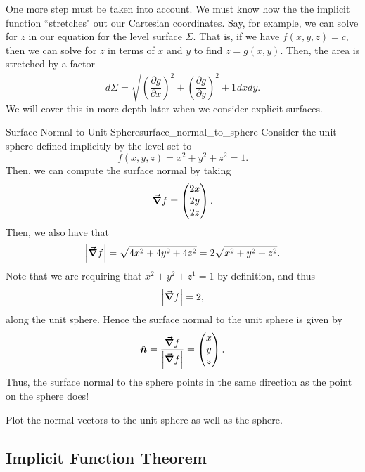                  One more step must be taken into account.  We must know how the the implicit function ``stretches" out our Cartesian coordinates.  Say, for example, we can solve for $z$ in our equation for the level surface $\Sigma$. That is, if we have $f(x,y,z)=c$, then we can solve for $z$ in terms of $x$ and $y$ to find $z=g(x,y)$.  Then, the area is stretched by a factor
                 \[
                 d\Sigma = \sqrt{ \left(\frac{\partial g}{\partial x}\right)^2 + \left(\frac{\partial g}{\partial y}\right)^2 +1 } dxdy.
                 \]
                 We will cover this in more depth later when we consider explicit surfaces.

                 \begin{ex}{Surface Normal to Unit Sphere}{surface_normal_to_sphere}
                 	Consider the unit sphere defined implicitly by the level set to
                 	\[
                 	f(x,y,z)=x^2+y^2+z^2 = 1.
                 	\]
                 	Then, we can compute the surface normal by taking
                 	\[
                 	\boldsymbol{\vec{\nabla}} f = \begin{pmatrix} 2x \\ 2y \\ 2z \end{pmatrix}.
                 	\]
                 	Then, we also have that
                 	\[
                 	\left| \boldsymbol{\vec{\nabla}} f \right| = \sqrt{4x^2+4y^2+4z^2} = 2 \sqrt{x^2+y^2+z^2}.
                 	\]
                 	Note that we are requiring that $x^2+y^2+z^1=1$ by definition, and thus
                 	\[
                 	\left| \boldsymbol{\vec{\nabla}} f\right| = 2,
                 	\]
                 	along the unit sphere. Hence the surface normal to the unit sphere is given by
                 	\[
                 	\boldsymbol{\hat{n}} = \frac{\boldsymbol{\vec{\nabla}} f}{\left| \boldsymbol{\vec{\nabla}} f \right|} = \begin{pmatrix} x \\ y \\ z \end{pmatrix}.
                 	\]
                 	Thus, the surface normal to the sphere points in the same direction as the point on the sphere does!
                 \end{ex}

                 \begin{exercise}
                 	Plot the normal vectors to the unit sphere as well as the sphere.
                 \end{exercise}

                 \subsection{Implicit Function Theorem}

